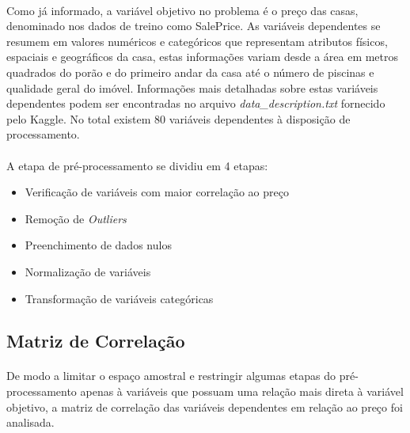 \documentclass{article}
\begin{document}
	\paragraph{}Como já informado, a variável objetivo no problema é o preço das casas, denominado nos dados de treino como SalePrice. As variáveis dependentes se resumem em valores numéricos e categóricos que representam atributos físicos, espaciais e geográficos da casa, estas informações variam desde a área em metros quadrados do porão e do primeiro andar da casa até o número de piscinas e qualidade geral do imóvel. Informações mais detalhadas sobre estas variáveis dependentes podem ser encontradas no arquivo \textit{data\_description.txt} fornecido pelo Kaggle. No total existem 80 variáveis dependentes à disposição de processamento.
	
	\paragraph{}A etapa de pré-processamento se dividiu em 4 etapas:
	\begin{itemize}
		\item Verificação de variáveis com maior correlação ao preço
		\item Remoção de \textit{Outliers}
		\item Preenchimento de dados nulos
		\item Normalização de variáveis
		\item Transformação de variáveis categóricas
	\end{itemize}
	
		\subsection{Matriz de Correlação}
			\paragraph{}De modo a limitar o espaço amostral e restringir algumas etapas do pré-processamento apenas à variáveis que possuam uma relação mais direta à variável objetivo, a matriz de correlação das variáveis dependentes em relação ao preço foi analisada.
			
\end{document}
